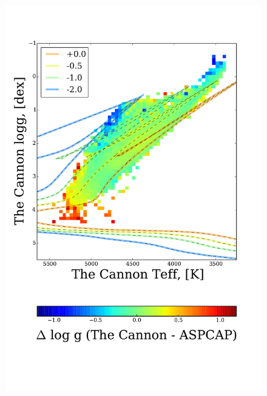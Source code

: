 \documentclass[12pt, preprint]{aastex}
\begin{document}
\begin{figure}[!h]
    \includegraphics[scale=0.26]{./plots/aftersubmit/g_diff2.pdf}

\end{figure}
\end{document}
